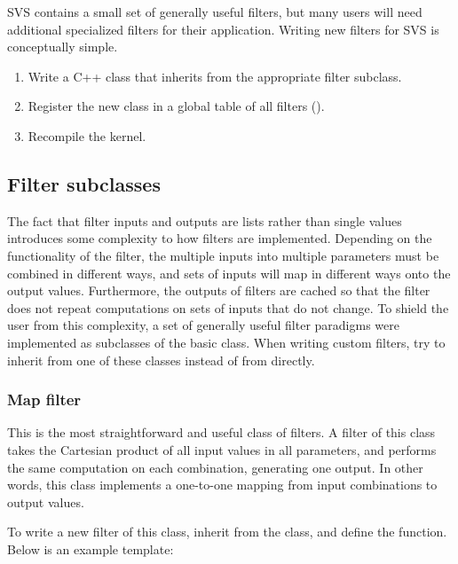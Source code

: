 SVS contains a small set of generally useful filters, but many users will need additional specialized filters for their application.
Writing new filters for SVS is conceptually simple.

\vspace{-12pt}
\begin{enumerate}
	\item Write a C++ class that inherits from the appropriate filter subclass.
	\vspace{-6pt}
	\item Register the new class in a global table of all filters ().
	\vspace{-6pt}
	\item Recompile the kernel. 
	\vspace{-6pt}
\end{enumerate}


\subsection{Filter subclasses}

The fact that filter inputs and outputs are lists rather than single values introduces some complexity to how filters are implemented.
Depending on the functionality of the filter, the multiple inputs into multiple parameters must be combined in different ways, and sets of inputs will map in different ways onto the output values.
Furthermore, the outputs of filters are cached so that the filter does not repeat computations on sets of inputs that do not change.
To shield the user from this complexity, a set of generally useful filter paradigms were implemented as subclasses of the basic  class.
When writing custom filters, try to inherit from one of these classes instead of from  directly.


\subsubsection{Map filter}

This is the most straightforward and useful class of filters.
A filter of this class takes the Cartesian product of all input values in all parameters,
and performs the same computation on each combination, generating one output.
In other words, this class implements a one-to-one mapping from input combinations to output values.

To write a new filter of this class, inherit from the  class, 
and define the  function. Below is an example template:

